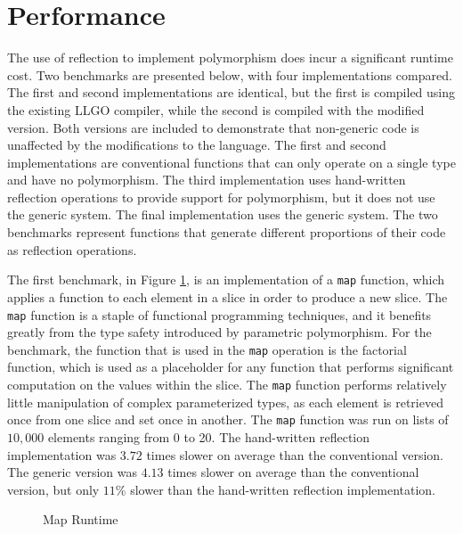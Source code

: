\documentclass[letterpaper,11pt]{article}
\begin{document}
\section{Performance} \label{results}

The use of reflection to implement polymorphism does incur a significant runtime cost. Two benchmarks are presented below, with four implementations compared. The first and second implementations are identical, but the first is compiled using the existing LLGO compiler, while the second is compiled with the modified version. Both versions are included to demonstrate that non-generic code is unaffected by the modifications to the language. The first and second implementations are conventional functions that can only operate on a single type and have no polymorphism. The third implementation uses hand-written reflection operations to provide support for polymorphism, but it does not use the generic system. The final implementation uses the generic system. The two benchmarks represent functions that generate different proportions of their code as reflection operations. 

The first benchmark, in Figure \ref{fig:map}, is an implementation of a \texttt{map} function, which applies a function to each element in a slice in order to produce a new slice. The \texttt{map} function is a staple of functional programming techniques, and it benefits greatly from the type safety introduced by parametric polymorphism. For the benchmark, the function that is used in the \texttt{map} operation is the factorial function, which is used as a placeholder for any function that performs significant computation on the values within the slice. The \texttt{map} function performs relatively little manipulation of complex parameterized types, as each element is retrieved once from one slice and set once in another. The \texttt{map} function was run on lists of $10,000$ elements ranging from 0 to 20. The hand-written reflection implementation was $3.72$ times slower on average than the conventional version. The generic version was $4.13$ times slower on average than the conventional version, but only $11\%$ slower than the hand-written reflection implementation.

\begin{figure}
    \caption{Map Runtime\label{fig:map}}
    \centering
    
\end{figure}
\end{document}
